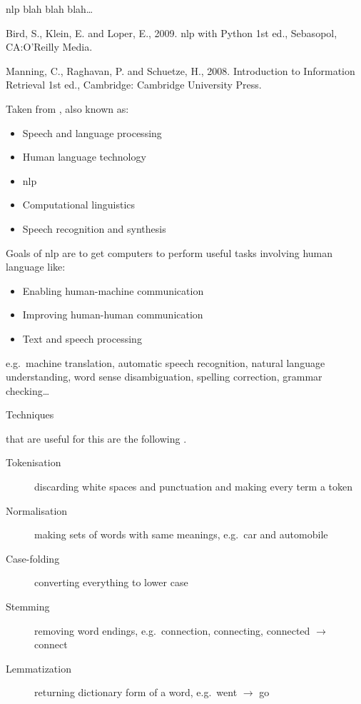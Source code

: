\gls{nlp} blah blah blah\ldots

Bird, S., Klein, E. and Loper, E., 2009. \gls{nlp} with Python 1st ed., Sebasopol, CA:\@ O'Reilly Media.\autocite{Bird2009}

Manning, C., Raghavan, P. and Schuetze, H., 2008. Introduction to Information Retrieval 1st ed., Cambridge: Cambridge University Press.\autocite{Manning2009}

Taken from \autocite{Jurafsky2009}, also known as:
\begin{itemize}
  \item Speech and language processing
  \item Human language technology
  \item \gls{nlp}
  \item Computational linguistics
  \item Speech recognition and synthesis
\end{itemize}

Goals of \gls{nlp} are to get computers to perform useful tasks involving human language like:
\begin{itemize}
  \item Enabling human-machine communication
  \item Improving human-human communication
  \item Text and speech processing
\end{itemize}

e.g.\ machine translation, automatic speech recognition, natural language understanding, word sense disambiguation, spelling correction, grammar checking…


\hypertarget{stemming}{Techniques} that are useful for this are the following \autocite[Ch.2]{Manning2009}.

\begin{description}
  \item [Tokenisation] discarding white spaces and punctuation and making every term a token
  \item [Normalisation] making sets of words with same meanings, e.g.\ car and automobile
  \item [Case-folding] converting everything to lower case
  \item [Stemming] removing word endings, e.g.\ connection, connecting, connected $\to$ connect
  \item [Lemmatization] returning dictionary form of a word, e.g.\ went $\to$ go
\end{description}


